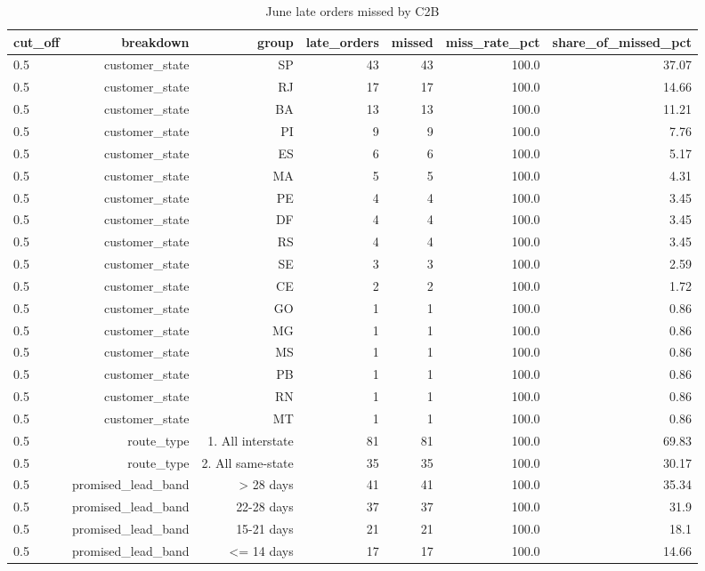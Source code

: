 \begin{table}[htbp]
\centering
\small
\caption{June late orders missed by C2B}
\begin{tabular}{lrrrrrr}
\toprule
cut\_off & breakdown & group & late\_orders & missed & miss\_rate\_pct & share\_of\_missed\_pct \\
\midrule
0.5 & customer\_state & SP & 43 & 43 & 100.0 & 37.07 \\
0.5 & customer\_state & RJ & 17 & 17 & 100.0 & 14.66 \\
0.5 & customer\_state & BA & 13 & 13 & 100.0 & 11.21 \\
0.5 & customer\_state & PI & 9 & 9 & 100.0 & 7.76 \\
0.5 & customer\_state & ES & 6 & 6 & 100.0 & 5.17 \\
0.5 & customer\_state & MA & 5 & 5 & 100.0 & 4.31 \\
0.5 & customer\_state & PE & 4 & 4 & 100.0 & 3.45 \\
0.5 & customer\_state & DF & 4 & 4 & 100.0 & 3.45 \\
0.5 & customer\_state & RS & 4 & 4 & 100.0 & 3.45 \\
0.5 & customer\_state & SE & 3 & 3 & 100.0 & 2.59 \\
0.5 & customer\_state & CE & 2 & 2 & 100.0 & 1.72 \\
0.5 & customer\_state & GO & 1 & 1 & 100.0 & 0.86 \\
0.5 & customer\_state & MG & 1 & 1 & 100.0 & 0.86 \\
0.5 & customer\_state & MS & 1 & 1 & 100.0 & 0.86 \\
0.5 & customer\_state & PB & 1 & 1 & 100.0 & 0.86 \\
0.5 & customer\_state & RN & 1 & 1 & 100.0 & 0.86 \\
0.5 & customer\_state & MT & 1 & 1 & 100.0 & 0.86 \\
0.5 & route\_type & 1. All interstate & 81 & 81 & 100.0 & 69.83 \\
0.5 & route\_type & 2. All same-state & 35 & 35 & 100.0 & 30.17 \\
0.5 & promised\_lead\_band & > 28 days & 41 & 41 & 100.0 & 35.34 \\
0.5 & promised\_lead\_band & 22-28 days & 37 & 37 & 100.0 & 31.9 \\
0.5 & promised\_lead\_band & 15-21 days & 21 & 21 & 100.0 & 18.1 \\
0.5 & promised\_lead\_band & <= 14 days & 17 & 17 & 100.0 & 14.66 \\

\end{tabular}
\end{table}
